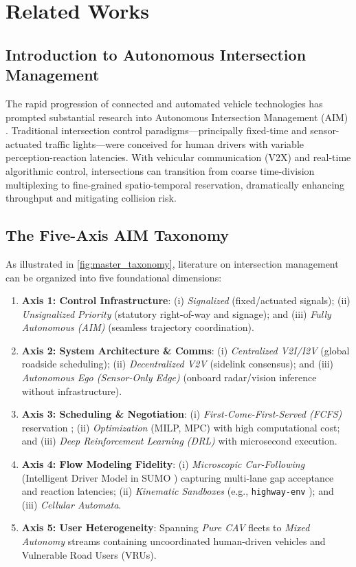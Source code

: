 \chapter{Related Works}
\label{ch:related_works}

\section{Introduction to Autonomous Intersection Management}
The rapid progression of connected and automated vehicle technologies has prompted substantial research into Autonomous Intersection Management (AIM) \cite{dresner2008multiagent, zhong2021autonomous}. Traditional intersection control paradigms---principally fixed-time and sensor-actuated traffic lights---were conceived for human drivers with variable perception-reaction latencies. With vehicular communication (V2X) and real-time algorithmic control, intersections can transition from coarse time-division multiplexing to fine-grained spatio-temporal reservation, dramatically enhancing throughput and mitigating collision risk.

\section{The Five-Axis AIM Taxonomy}
\label{sec:taxonomy}
As illustrated in \autoref{fig:master_taxonomy}, literature on intersection management can be organized into five foundational dimensions:
\begin{enumerate}
    \setlength{\itemsep}{0pt}\setlength{\parskip}{0pt}
    \item \textbf{Axis 1: Control Infrastructure}: (i) \textit{Signalized} (fixed/actuated signals); (ii) \textit{Unsignalized Priority} (statutory right-of-way and signage); and (iii) \textit{Fully Autonomous (AIM)} (seamless trajectory coordination).
    \item \textbf{Axis 2: System Architecture \& Comms}: (i) \textit{Centralized V2I/I2V} (global roadside scheduling); (ii) \textit{Decentralized V2V} (sidelink consensus); and (iii) \textit{Autonomous Ego (Sensor-Only Edge)} (onboard radar/vision inference without infrastructure).
    \item \textbf{Axis 3: Scheduling \& Negotiation}: (i) \textit{First-Come-First-Served (FCFS)} reservation \cite{dresner2008multiagent}; (ii) \textit{Optimization} (MILP, MPC) with high computational cost; and (iii) \textit{Deep Reinforcement Learning (DRL)} with microsecond execution.
    \item \textbf{Axis 4: Flow Modeling Fidelity}: (i) \textit{Microscopic Car-Following} (Intelligent Driver Model \cite{treiber2000congested} in SUMO \cite{krajzewicz2012recent}) capturing multi-lane gap acceptance and reaction latencies; (ii) \textit{Kinematic Sandboxes} (e.g., \texttt{highway-env} \cite{leurent2018highway}); and (iii) \textit{Cellular Automata}.
    \item \textbf{Axis 5: User Heterogeneity}: Spanning \textit{Pure CAV} fleets to \textit{Mixed Autonomy} streams containing uncoordinated human-driven vehicles and Vulnerable Road Users (VRUs).
\end{enumerate}

